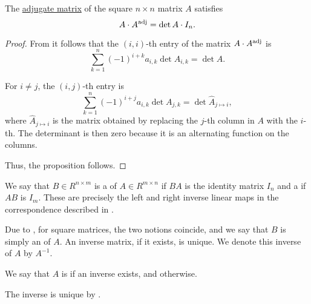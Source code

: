 \begin{proposition}\label{thm:inverse_via_adjunction}
  The \hyperref[def:adjugate_matrix]{adjugate matrix} of the square \( n \times n \) matrix \( A \) satisfies
  \begin{equation*}
    A \cdot A^{\op{adj}} = \det A \cdot I_n.
  \end{equation*}
\end{proposition}
\begin{proof}
  From  it follows that the \( (i, i) \)-th entry of the matrix \( A \cdot A^{\op{adj}} \) is
  \begin{equation*}
    \sum_{k=1}^n (-1)^{i + k} a_{i,k} \det A_{i,k}
    =
    \det A.
  \end{equation*}

  For \( i \neq j \), the \( (i, j) \)-th entry is
  \begin{equation*}
    \sum_{k=1}^n (-1)^{i + j} a_{i,k} \det A_{j,k}
    =
    \det \widehat A_{j \mapsto i},
  \end{equation*}
  where \( \widehat A_{j \mapsto i} \) is the matrix obtained by replacing the \( j \)-th column in \( A \) with the \( i \)-th. The determinant is then zero because it is an alternating function on the columns.

  Thus, the proposition follows.
\end{proof}

\begin{definition}\label{def:inverse_matrix}
  We say that \( B \in R^{n \times m} \) is a  of \( A \in R^{m \times n} \) if \( BA \) is the identity matrix \( I_n \) and a  if \( AB \) is \( I_m \). These are precisely the left and right inverse linear maps in the correspondence described in .

  Due to , for square matrices, the two notions coincide, and we say that \( B \) is simply an  of \( A \). An inverse matrix, if it exists, is unique. We denote this inverse of \( A \) by \( A^{-1} \).

  We say that \( A \) is  if an inverse exists, and  otherwise.
\end{definition}
\begin{defproof}
  The inverse is unique by .
\end{defproof}

